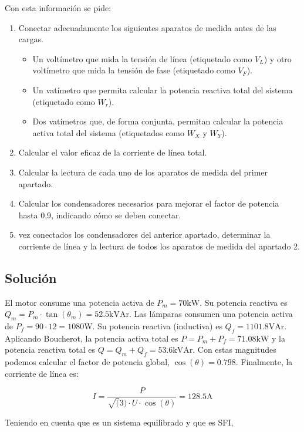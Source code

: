 Con esta información se pide:

\begin{enumerate}
\item Conectar adecuadamente los siguientes aparatos de medida antes
  de las cargas.
  \begin{itemize}
  \item Un voltímetro que mida la tensión de línea (etiquetado como
    $V_L$) y otro voltímetro que mida la tensión de fase (etiquetado
    como $V_F$).
  \item Un vatímetro que permita calcular la potencia reactiva total
    del sistema (etiquetado como $W_r$).
  \item Dos vatímetros que, de forma conjunta, permitan calcular la
    potencia activa total del sistema (etiquetados como $W_X$ y
    $W_Y$).
  \end{itemize}
\item Calcular el valor eficaz de la corriente de línea
  total.
\item Calcular la lectura de cada uno de los aparatos
  de medida del primer apartado.
\item Calcular los condensadores necesarios para
  mejorar el factor de potencia hasta 0,9, indicando cómo se deben
  conectar.
\item vez conectados los condensadores del anterior
  apartado, determinar la corriente de línea y la lectura de todos los
  aparatos de medida del apartado 2.
\end{enumerate}

\subsection*{Solución}

El motor consume una potencia activa de $P_m = 70\mathrm{kW}$. Su
potencia reactiva es
$Q_m = P_m \cdot \tan(\theta_m) = 52.5\mathrm{kVAr}$.  Las lámparas
consumen una potencia activa de $P_f = 90 \cdot 12 =
1080\mathrm{W}$. Su potencia reactiva (inductiva) es
$Q_f = 1101.8\mathrm{VAr}$.  Aplicando Boucherot, la potencia activa
total es $P = P_m + P_f = 71.08\mathrm{kW}$ y la potencia reactiva
total es $Q = Q_m + Q_f = 53.6\mathrm{kVAr}$. Con estas magnitudes
podemos calcular el factor de potencia global, $\cos(\theta) =
0.798$. Finalmente, la corriente de línea es:

\[
  I = \frac{P}{\sqrt(3) \cdot U \cdot \cos(\theta)} = 128.5\mathrm{A}
\]


Teniendo en cuenta que es un sistema equilibrado y que es SFI,

